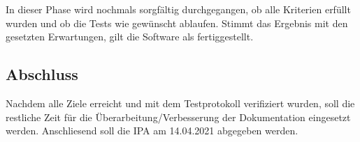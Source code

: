 In dieser Phase wird nochmals sorgfältig durchgegangen, ob alle Kriterien erfüllt wurden und ob die Tests wie gewünscht ablaufen. Stimmt das Ergebnis mit den gesetzten Erwartungen, gilt die Software als fertiggestellt.

\subsection{Abschluss}

Nachdem alle Ziele erreicht und mit dem Testprotokoll verifiziert wurden, soll die restliche Zeit für die Überarbeitung/Verbesserung der Dokumentation eingesetzt werden. Anschliesend soll die IPA am 14.04.2021 abgegeben werden.